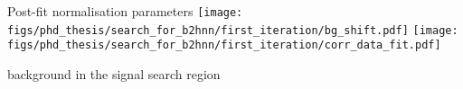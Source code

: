 \begin{frame}[noframenumbering]{Post-fit normalisation parameters}
\texttt{[image: figs/phd\_thesis/search\_for\_b2hnn/first\_iteration/bg\_shift.pdf]}
\texttt{[image: figs/phd\_thesis/search\_for\_b2hnn/first\_iteration/corr\_data\_fit.pdf]}
\end{frame}
\begin{frame}[noframenumbering]{\Bp background in the signal search region}
\centering
{}
\end{frame}
